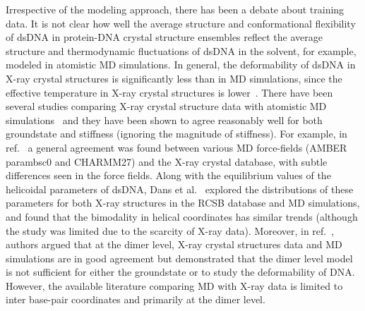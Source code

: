 Irrespective of the modeling approach, there has been a debate about training data. 
It is not clear how well the average structure and conformational flexibility of dsDNA in protein-DNA crystal structure ensembles reflect the average structure and thermodynamic fluctuations of dsDNA in the solvent,
for example, modeled in atomistic MD simulations.
In general, the deformability of dsDNA in X-ray crystal structures is significantly less than in MD simulations, since the effective temperature in X-ray crystal structures is lower~\cite{lankavs2003dna,becker2006indirect}. 
There have been several studies comparing X-ray crystal structure data with atomistic MD simulations~\cite{perez2008towards,fujii2007sequence,perez2004relative,olson2006dna,dans2012exploring,madhumalar2005sequence} and they have been shown to agree reasonably well for both groundstate and stiffness (ignoring the magnitude of stiffness). 
For example, in ref.~\cite{perez2008towards} a general agreement was found between various MD force-fields (AMBER parambsc0 and CHARMM27) and the X-ray crystal database, with subtle differences seen in the force fields.
Along with the equilibrium values of the helicoidal parameters of dsDNA, Dans et al.~\cite{dans2012exploring} explored the distributions of these parameters for both X-ray structures in the RCSB database and MD simulations, and found that the bimodality 
in helical coordinates has similar trends (although the study was limited due to the scarcity of X-ray data).
Moreover, in ref.~\cite{lankavs2003dna}, authors argued that at the dimer level, X-ray crystal structures data and MD simulations are in good agreement but demonstrated that the dimer level model is not sufficient for either the groundstate or to study the deformability of DNA.
However, the available literature comparing MD with X-ray data is limited 
to inter base-pair coordinates and primarily at the dimer level. 


